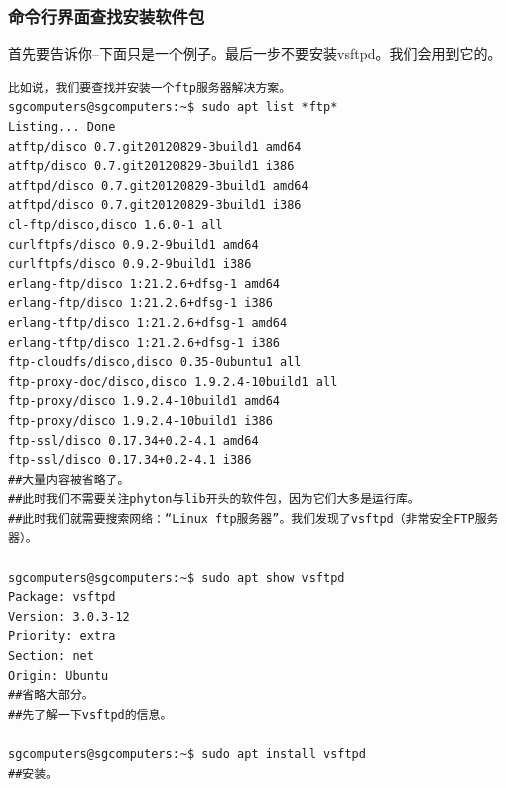 \subsubsection{命令行界面查找安装软件包}
首先要告诉你--下面只是一个例子。最后一步不要安装vsftpd。我们会用到它的。
\begin{verbatim}
比如说，我们要查找并安装一个ftp服务器解决方案。
sgcomputers@sgcomputers:~$ sudo apt list *ftp*
Listing... Done
atftp/disco 0.7.git20120829-3build1 amd64
atftp/disco 0.7.git20120829-3build1 i386
atftpd/disco 0.7.git20120829-3build1 amd64
atftpd/disco 0.7.git20120829-3build1 i386
cl-ftp/disco,disco 1.6.0-1 all
curlftpfs/disco 0.9.2-9build1 amd64
curlftpfs/disco 0.9.2-9build1 i386
erlang-ftp/disco 1:21.2.6+dfsg-1 amd64
erlang-ftp/disco 1:21.2.6+dfsg-1 i386
erlang-tftp/disco 1:21.2.6+dfsg-1 amd64
erlang-tftp/disco 1:21.2.6+dfsg-1 i386
ftp-cloudfs/disco,disco 0.35-0ubuntu1 all
ftp-proxy-doc/disco,disco 1.9.2.4-10build1 all
ftp-proxy/disco 1.9.2.4-10build1 amd64
ftp-proxy/disco 1.9.2.4-10build1 i386
ftp-ssl/disco 0.17.34+0.2-4.1 amd64
ftp-ssl/disco 0.17.34+0.2-4.1 i386
##大量内容被省略了。
##此时我们不需要关注phyton与lib开头的软件包，因为它们大多是运行库。
##此时我们就需要搜索网络：“Linux ftp服务器”。我们发现了vsftpd（非常安全FTP服务器）。

sgcomputers@sgcomputers:~$ sudo apt show vsftpd
Package: vsftpd
Version: 3.0.3-12
Priority: extra
Section: net
Origin: Ubuntu
##省略大部分。
##先了解一下vsftpd的信息。

sgcomputers@sgcomputers:~$ sudo apt install vsftpd
##安装。
\end{verbatim}
